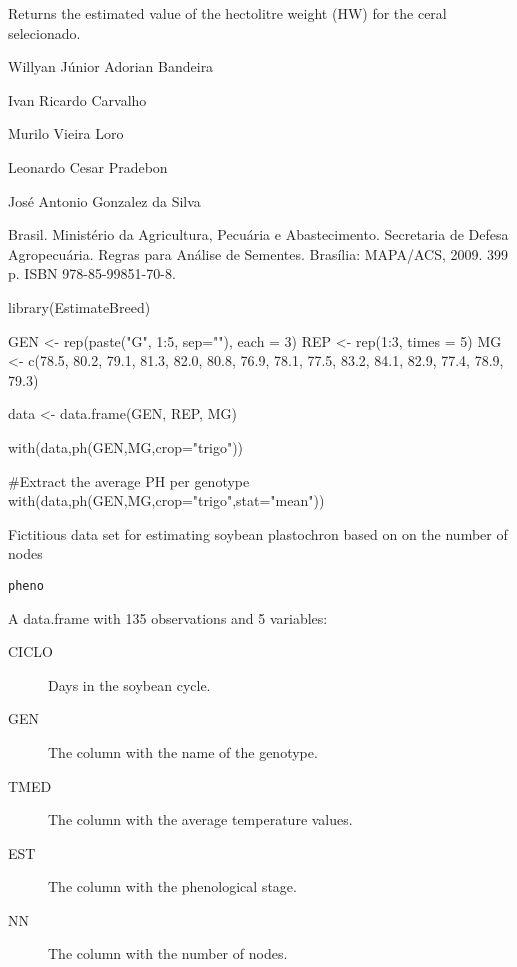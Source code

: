 \documentclass[a4paper]{book}
\begin{document}
%
\begin{Value}
Returns the estimated value of the hectolitre weight (HW) for the ceral
selecionado.
\end{Value}
%
\begin{Author}
Willyan Júnior Adorian Bandeira

Ivan Ricardo Carvalho

Murilo Vieira Loro

Leonardo Cesar Pradebon

José Antonio Gonzalez da Silva
\end{Author}
%
\begin{References}
Brasil. Ministério da Agricultura, Pecuária e Abastecimento.
Secretaria de Defesa Agropecuária. Regras para Análise de Sementes.
Brasília: MAPA/ACS, 2009. 399 p. ISBN 978-85-99851-70-8.
\end{References}
%
\begin{Examples}
\begin{ExampleCode}

library(EstimateBreed)

GEN <- rep(paste("G", 1:5, sep=""), each = 3)
REP <- rep(1:3, times = 5)
MG <- c(78.5, 80.2, 79.1, 81.3, 82.0, 80.8, 76.9, 78.1, 77.5, 83.2,
84.1, 82.9, 77.4, 78.9, 79.3)

data <- data.frame(GEN, REP, MG)

with(data,ph(GEN,MG,crop="trigo"))

#Extract the average PH per genotype
with(data,ph(GEN,MG,crop="trigo",stat="mean"))

\end{ExampleCode}
\end{Examples}
%
\begin{Description}
Fictitious data set for estimating soybean plastochron based on
on the number of nodes
\end{Description}
%
\begin{Usage}
\begin{verbatim}
pheno
\end{verbatim}
\end{Usage}
%
\begin{Format}
A data.frame with 135 observations and 5 variables:
\begin{description}

\item[CICLO] Days in the soybean cycle.
\item[GEN] The column with the name of the genotype.
\item[TMED] The column with the average temperature values.
\item[EST] The column with the phenological stage.
\item[NN] The column with the number of nodes.

\end{description}

\end{Format}
\end{document}
